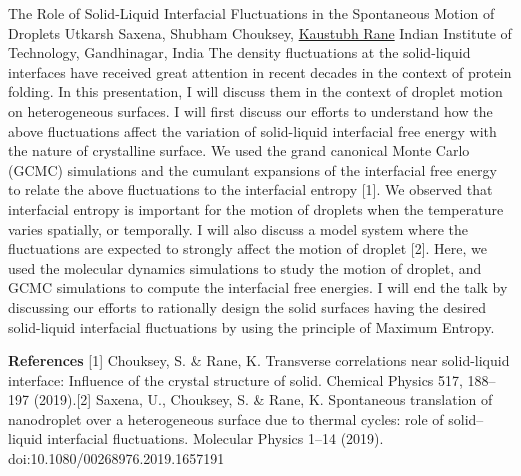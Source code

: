 
    \begin{abstract_online}{The Role of Solid-Liquid Interfacial Fluctuations in the Spontaneous Motion of Droplets}{%
        Utkarsh Saxena, Shubham Chouksey, \underline{Kaustubh Rane}}{%
        \IStag}{%
        Indian Institute of Technology, Gandhinagar, India}
    The density fluctuations at the solid-liquid interfaces have received great attention in recent decades in the context of protein folding. In this presentation, I will discuss them in the context of droplet motion on heterogeneous surfaces. I will first discuss our efforts to understand how the above fluctuations affect the variation of solid-liquid interfacial free energy with the nature of crystalline surface. We used the grand canonical Monte Carlo (GCMC) simulations and the cumulant expansions of the interfacial free energy to relate the above fluctuations to the interfacial entropy [1]. We observed that interfacial entropy is important for the motion of droplets when the temperature varies spatially, or temporally. I will also discuss a model system where the fluctuations are expected to strongly affect the motion of droplet [2]. Here, we used the molecular dynamics simulations to study the motion of droplet, and GCMC simulations to compute the interfacial free energies. I will end the talk by discussing our efforts to rationally design the solid surfaces having the desired solid-liquid interfacial fluctuations by using the principle of Maximum Entropy. 
    
        \textbf{References} \newline{}[1] Chouksey, S. & Rane, K. Transverse correlations near solid-liquid interface: Influence of the crystal structure of solid. Chemical Physics 517, 188–197 (2019).\newline{}[2] Saxena, U., Chouksey, S. & Rane, K. Spontaneous translation of nanodroplet over a heterogeneous surface due to thermal cycles: role of solid–liquid interfacial fluctuations. Molecular Physics 1–14 (2019). doi:10.1080/00268976.2019.1657191
    \end{abstract_online}
    